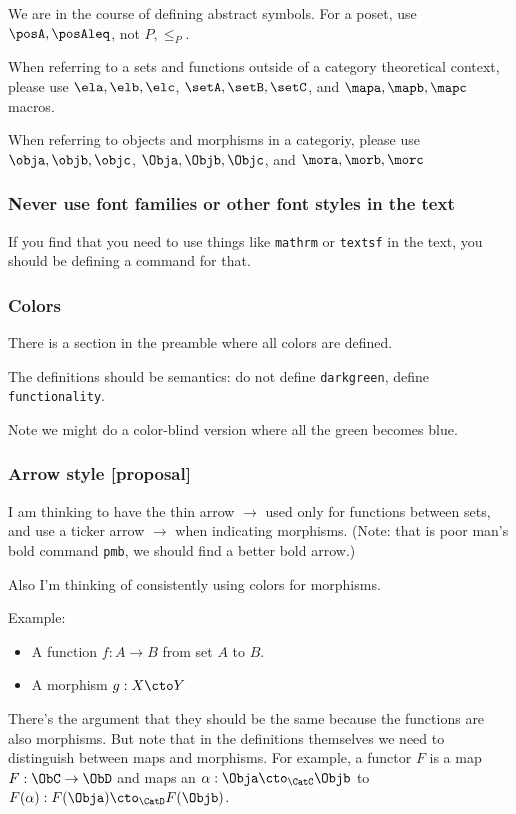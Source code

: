 We are in the course of defining abstract symbols.
For a poset, use $\posA,\posAleq$, not $P,\leq_P$.

When referring to a sets and functions outside of a category theoretical context, please use $\ela,\elb,\elc$, $\setA,\setB,\setC$, and $\mapa,\mapb,\mapc$ macros.

When referring to objects and morphisms in a categoriy, please use $\obja,\objb,\objc$, $\Obja,\Objb,\Objc$, and $\mora,\morb,\morc$


\subsubsection*{Never use font families or other font styles in the text}

If you find that you need to use things like \texttt{mathrm} or \texttt{textsf} in the text, you should be defining a command for that.

\subsubsection*{Colors}

There is a section in the preamble where all colors are defined.

The definitions should be semantics: do not define \texttt{darkgreen}, define \texttt{functionality}.

Note we might do a color-blind version where all the green becomes blue.


\subsubsection*{Arrow style [proposal]}

I am thinking to have the thin arrow $\to$ used only for functions between sets, and use a ticker arrow $\pmb{\to}$ when indicating morphisms.
(Note: that is poor man's bold command \texttt{pmb}, we should find a better bold arrow.)


Also I'm thinking of consistently using colors for morphisms.

Example:
\begin{itemize}
  \item A function $f: A \to B$ from set $A$ to $B$.
  \item A morphism $g: X \cto  Y$
\end{itemize}

There's the argument that they should be the same because the functions are also morphisms. But note that in the definitions themselves we need to distinguish between maps and morphisms. For example, a functor $F$ is a map $F: \ObC \to \ObD$ and maps an $\alpha: \Obja \cto_{\CatC} \Objb $ to $F(\alpha): F(\Obja) \cto_{\CatD} F(\Objb) $.


